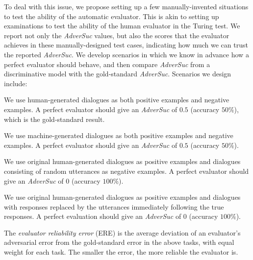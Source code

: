 To deal with this issue, we propose setting up a few manually-invented situations to test the ability of the automatic evaluator.
 This is akin to setting up  examinations to test the ability of the human evaluator in the Turing test. 
We  report not only the {\it AdverSuc} values,  but also the scores that the evaluator
achieves
 in these manually-designed test cases, indicating how much we can trust the reported {\it AdverSuc}. 
 We develop scenarios in which we know  in advance how a perfect evaluator should behave, and then compare   {\it AdverSuc}  from a discriminative model with the gold-standard  {\it AdverSuc}. Scenarios we design include:
 \begin{tightitemize}
 \item We use human-generated dialogues as both positive examples and negative examples. A perfect evaluator should give an {\it AdverSuc} of $0.5$ (accuracy $50\%$), which is the gold-standard result.
  \item We use machine-generated dialogues as both positive examples and negative examples. A perfect evaluator should give an {\it AdverSuc} of $0.5$ (accuracy $50\%$).
 \item We use original human-generated dialogues as positive examples and dialogues 
 consisting of
  random utterances 
  as negative examples. A perfect evaluator should give an {\it AdverSuc} of $0$ (accuracy $100\%$).
 \item We use original human-generated dialogues as positive examples and dialogues with 
 responses replaced by the utterances immediately following the true responses. 
 A perfect evaluation should give an {\it AdverSuc} of $0$ (accuracy $100\%$).
\end{tightitemize}
The {\it evaluator reliability error} (ERE) is the average deviation of an evaluator's adversarial error
 from the gold-standard error in the above tasks, with equal weight for each task. 
The smaller the error, the more reliable the evaluator is. 

